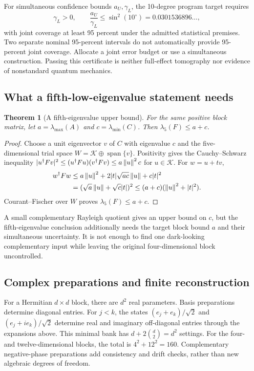 \documentclass[11pt,a4paper]{article}
\newtheorem{theorem}{Theorem}[section]\newtheorem{lemma}[theorem]{Lemma}\newtheorem{corollary}[theorem]{Corollary}\newtheorem{definition}[theorem]{Definition}\newtheorem{proposition}[theorem]{Proposition}
\begin{document}
For simultaneous confidence bounds $a_U,\gamma_L$, the 10-degree program target requires
\begin{equation}
\gamma_L>0,\qquad \frac{a_U}{\gamma_L}\le\sin^2(10^\circ)
=0.0301536896\ldots,
\end{equation}
with joint coverage at least 95 percent under the admitted statistical premises. Two separate nominal 95-percent intervals do not automatically provide 95-percent joint coverage. Allocate a joint error budget or use a simultaneous construction. Passing this certificate is neither full-effect tomography nor evidence of nonstandard quantum mechanics.

\subsection{What a fifth-low-eigenvalue statement needs}
\begin{theorem}[A fifth-eigenvalue upper bound]\label{thm:fifth}
For the same positive block matrix, let $a=\lambda_{\max}(A)$ and $c=\lambda_{\min}(C)$. Then $\lambda_5(F)\le a+c$.
\end{theorem}
\begin{proof}
Choose a unit eigenvector $v$ of $C$ with eigenvalue $c$ and the five-dimensional trial space $W=\mathcal K\oplus\operatorname{span}\{v\}$. Positivity gives the Cauchy--Schwarz inequality $|u^\dagger Fv|^2\le(u^\dagger Fu)(v^\dagger Fv)\le a\left\lVert u\right\rVert^2 c$ for $u\in\mathcal K$. For $w=u+tv$,
\begin{align*}
w^\dagger Fw&\le a\left\lVert u\right\rVert^2+2|t|\sqrt{ac}\left\lVert u\right\rVert+c|t|^2\\
&=(\sqrt a\left\lVert u\right\rVert+\sqrt c|t|)^2
\le(a+c)(\left\lVert u\right\rVert^2+|t|^2).
\end{align*}
Courant--Fischer over $W$ proves $\lambda_5(F)\le a+c$.
\end{proof}
A small complementary Rayleigh quotient gives an upper bound on $c$, but the fifth-eigenvalue conclusion additionally needs the target block bound $a$ and their simultaneous uncertainty. It is not enough to find one dark-looking complementary input while leaving the original four-dimensional block uncontrolled.

\subsection{Complex preparations and finite reconstruction}
For a Hermitian $d\times d$ block, there are $d^2$ real parameters. Basis preparations determine diagonal entries. For $j<k$, the states $(e_j+e_k)/\sqrt2$ and $(e_j+i e_k)/\sqrt2$ determine real and imaginary off-diagonal entries through the expansions above. This minimal bank has $d+2\binom d2=d^2$ settings. For the four- and twelve-dimensional blocks, the total is $4^2+12^2=160$. Complementary negative-phase preparations add consistency and drift checks, rather than new algebraic degrees of freedom.
\end{document}
